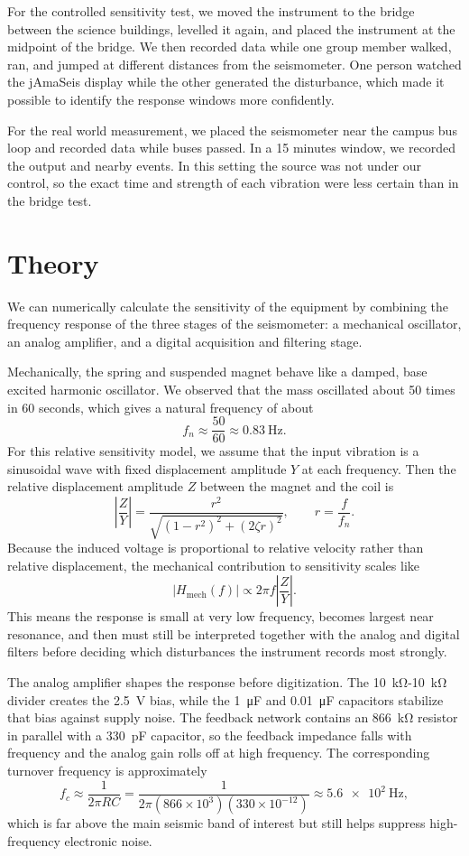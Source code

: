\documentclass[11pt]{article}
\begin{document}
For the controlled sensitivity test, we moved the instrument to the bridge between the science buildings, levelled it again, and placed the instrument at the midpoint of the bridge. We then recorded data while one group member walked, ran, and jumped at different distances from the seismometer. One person watched the jAmaSeis display while the other generated the disturbance, which made it possible to identify the response windows more confidently.

For the real world measurement, we placed the seismometer near the campus bus loop and recorded data while buses passed. In a 15 minutes window, we recorded the output and nearby events. In this setting the source was not under our control, so the exact time and strength of each vibration were less certain than in the bridge test.

\section{Theory}
We can numerically calculate the sensitivity of the equipment by combining the frequency response of the three stages of the seismometer: a mechanical oscillator, an analog amplifier, and a digital acquisition and filtering stage. 

Mechanically, the spring and suspended magnet behave like a damped, base excited harmonic oscillator. We observed that the mass oscillated about 50 times in 60 seconds, which gives a natural frequency of about
\[
f_n \approx \frac{50}{60} \approx \SI{0.83}{\hertz}.
\]
For this relative sensitivity model, we assume that the input vibration is a sinusoidal wave with fixed displacement amplitude $Y$ at each frequency. Then the relative displacement amplitude $Z$ between the magnet and the coil is
\[
\left| \frac{Z}{Y} \right|
= \frac{r^2}{\sqrt{(1-r^2)^2 + (2 \zeta r)^2}},
\qquad
r = \frac{f}{f_n}.
\]
Because the induced voltage is proportional to relative velocity rather than relative displacement, the mechanical contribution to sensitivity scales like
\[
|H_{\text{mech}}(f)| \propto 2 \pi f \left| \frac{Z}{Y} \right|.
\]
This means the response is small at very low frequency, becomes largest near resonance, and then must still be interpreted together with the analog and digital filters before deciding which disturbances the instrument records most strongly.

The analog amplifier shapes the response before digitization. The \SI{10}{\kilo\ohm}-\SI{10}{\kilo\ohm} divider creates the \SI{2.5}{\volt} bias, while the \SI{1}{\micro\farad} and \SI{0.01}{\micro\farad} capacitors stabilize that bias against supply noise. The feedback network contains an \SI{866}{\kilo\ohm} resistor in parallel with a \SI{330}{\pico\farad} capacitor, so the feedback impedance falls with frequency and the analog gain rolls off at high frequency. The corresponding turnover frequency is approximately
\[
f_c \approx \frac{1}{2 \pi R C}
= \frac{1}{2 \pi (866 \times 10^3)(330 \times 10^{-12})}
\approx \SI{5.6e2}{\hertz},
\]
which is far above the main seismic band of interest but still helps suppress high-frequency electronic noise.
\end{document}
